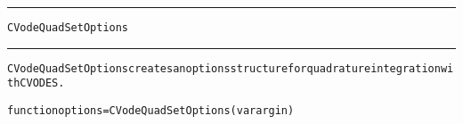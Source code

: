 \begin{samepage}
\hrule
\begin{center}
{\large \verb!CVodeQuadSetOptions!}
\label{p:CVodeQuadSetOptions}
\end{center}
\hrule\vspace{0.1in}



\begin{alltt}
CVodeQuadSetOptions creates an options structure for quadrature integration with CVODES.
\end{alltt}

\end{samepage}



\begin{samepage}


\begin{alltt}
function options = CVodeQuadSetOptions(varargin) 
\end{alltt}

\end{samepage}



